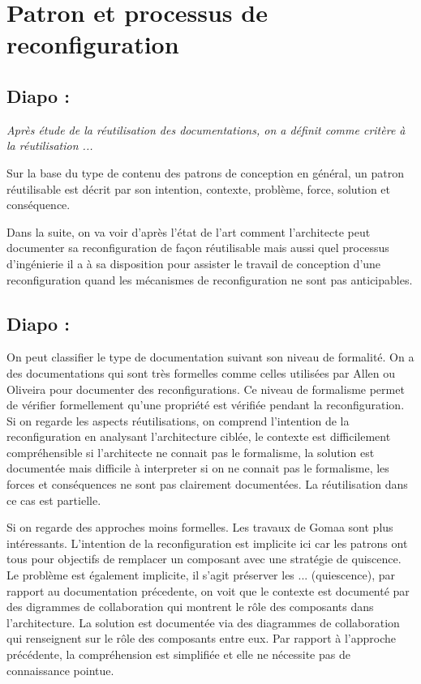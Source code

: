\section{Patron et processus de reconfiguration}

\subsection{Diapo :}

\textit{Après étude de la réutilisation des documentations, on a définit comme
critère à la réutilisation  ... }



Sur la base du type de
contenu des patrons de conception en général, un patron réutilisable
est décrit par son intention, contexte, problème, force, solution et
conséquence. 



Dans la suite, on va voir d'après l'état de
l'art comment l'architecte peut documenter sa reconfiguration de façon
réutilisable mais aussi quel processus d'ingénierie il a à sa
disposition pour assister le travail de conception d'une
reconfiguration quand les mécanismes de reconfiguration ne sont pas
anticipables.   

\subsection{Diapo : }
On peut classifier le type de documentation suivant son niveau de
formalité. On a des documentations qui sont très formelles comme
celles utilisées par Allen ou Oliveira pour documenter des
reconfigurations. Ce niveau de formalisme permet de vérifier
formellement qu'une propriété est vérifiée pendant la reconfiguration. 
Si on regarde les aspects réutilisations, on comprend l'intention de
la reconfiguration en analysant l'architecture ciblée, le contexte est
difficilement compréhensible si l'architecte ne connait pas le
formalisme, la solution est documentée mais difficile à interpreter si
on ne connait pas le formalisme, les forces et conséquences ne sont pas
clairement documentées. La réutilisation dans ce cas est partielle. 

Si on regarde des approches moins formelles. Les travaux de Gomaa sont
plus intéressants. L'intention de la reconfiguration est implicite ici
car les patrons ont tous pour objectifs de remplacer un composant avec
une stratégie de quiscence. Le problème est également implicite, il
s'agit préserver les ... (quiescence), par rapport au documentation
précedente, on voit que le contexte est documenté par des digrammes de
collaboration qui montrent le rôle des composants dans l'architecture. 
La solution est documentée via des diagrammes de collaboration qui
renseignent sur le rôle des composants entre eux. Par rapport à
l'approche précédente, la compréhension est simplifiée et elle ne
nécessite pas de connaissance pointue. 


